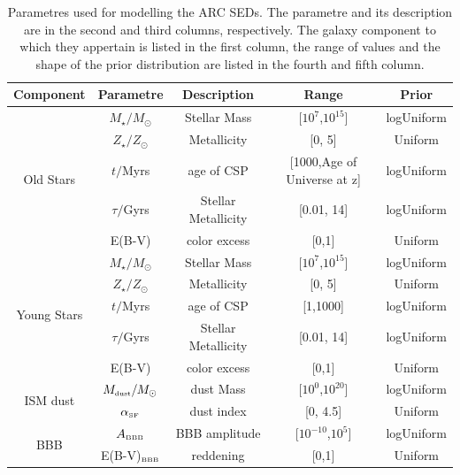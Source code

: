 \begin{table}
\caption{Parametres used for modelling the ARC SEDs. The parametre and its description are in the second and third columns, respectively. The galaxy component to which they appertain is listed in the first column, the range of values and the shape of the prior distribution are listed in the fourth and fifth column.}
    \centering
    \begin{tabular}{ccccc}
    \addlinespace
    \hline  %
    Component & Parametre & Description & Range &  Prior      \\
    \hline   %
    \hline   %
    \multirow{5}{4em}{Old Stars} & $ M_\star/M_\odot$ & Stellar Mass & [$10^7$,$10^{15}$] & logUniform \\ 
                                & $Z_\star/Z_\odot$ &  Metallicity & [0, 5] & Uniform \\ 
                                & $t/$Myrs & age of CSP & [1000,Age of Universe at z] & logUniform \\ 
                                & $\tau/$Gyrs & Stellar Metallicity & [0.01, 14] & logUniform \\ 
                                & E(B-V) & color excess & [0,1] & Uniform \\          
    \hline
    \multirow{5}{4em}{Young Stars} & $ M_\star/M_\odot$ & Stellar Mass & [$10^7$,$10^{15}$] & logUniform \\ 
                                & $Z_\star/Z_\odot$ &  Metallicity & [0, 5] & Uniform \\ 
                                & $t/$Myrs & age of CSP & [1,1000] & logUniform \\ 
                                & $\tau/$Gyrs & Stellar Metallicity & [0.01, 14] & logUniform \\ 
                                & E(B-V) & color excess & [0,1] & Uniform \\
    \hline
    \multirow{2}{4em}{ISM dust } & $ M_{\mbox{\tiny{dust}}}/M_\odot$ & dust Mass & [$10^0$,$10^{20}$] & logUniform \\ 
                                & $\alpha_{\mbox{\tiny{SF}}}$ &  dust index & [0, 4.5] & Uniform \\ 
    \hline
    \multirow{2}{4em}{BBB } &  $A_{\mbox{\tiny{BBB}}}$ &  BBB amplitude & [$10^{-10}$,$10^5$] & logUniform \\ 
                            & E(B-V)$_{\mbox{\tiny{BBB}}}$ & reddening & [0,1] & Uniform \\ 

\end{tabular}
\end{table}
